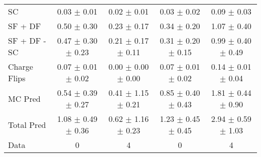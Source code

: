 \begin{tabular}{l|cccc}
                                 SC &  0.03 $\pm$  0.01 &  0.02 $\pm$  0.01 &  0.03 $\pm$  0.02 &  0.09 $\pm$  0.03 \\
                            SF + DF &  0.50 $\pm$  0.30 &  0.23 $\pm$  0.17 &  0.34 $\pm$  0.20 &  1.07 $\pm$  0.40 \\
\hline
                       SF + DF - SC &  0.47 $\pm$  0.30 $\pm$  0.23 &  0.21 $\pm$  0.17 $\pm$  0.11 &  0.31 $\pm$  0.20 $\pm$  0.15 &  0.99 $\pm$  0.40 $\pm$  0.49 \\
\hline\hline
                       Charge Flips &  0.07 $\pm$  0.01 $\pm$  0.02 &  0.00 $\pm$  0.00 $\pm$  0.00 &  0.07 $\pm$  0.01 $\pm$  0.02 &  0.14 $\pm$  0.01 $\pm$  0.04 \\
\hline
                            MC Pred &  0.54 $\pm$  0.39 $\pm$  0.27 &  0.41 $\pm$  1.15 $\pm$  0.21 &  0.85 $\pm$  0.40 $\pm$  0.43 &  1.81 $\pm$  0.44 $\pm$  0.90 \\
\hline
                         Total Pred &  1.08 $\pm$  0.49 $\pm$  0.36 &  0.62 $\pm$  1.16 $\pm$  0.23 &  1.23 $\pm$  0.45 $\pm$  0.45 &  2.94 $\pm$  0.59 $\pm$  1.03 \\
\hline\hline
                               Data &     0 &     4 &     0 &     4 \\
\hline\hline
\end{tabular}

